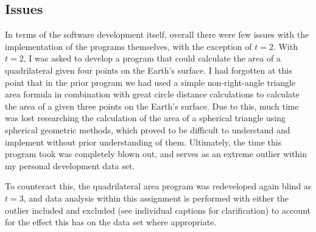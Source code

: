 \documentclass[a4paper,10pt]{article}
\begin{document}
\subsection{Issues}
In terms of the software development itself, overall there were few issues with the implementation of the programs themselves, with the exception of $t=2$. With $t=2$, I was asked to develop a program that could calculate the area of a quadrilateral given four points on the Earth's surface. I had forgotten at this point that in the prior program we had used a simple non-right-angle triangle area formula in combination with great circle distance calculations to calculate the area of a given three points on the Earth's surface. Due to this, much time was lost researching the calculation of the area of a spherical triangle using spherical geometric methods, which proved to be difficult to understand and implement without prior understanding of them. Ultimately, the time this program took was completely blown out, and serves as an extreme outlier within my personal development data set.

To counteract this, the quadrilateral area program was redeveloped again blind as $t=3$, and data analysis within this assignment is performed with either the outlier included and excluded (see individual captions for clarification) to account for the effect this has on the data set where appropriate. 
\end{document}
